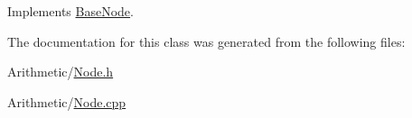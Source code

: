 Implements \hyperlink{class_base_node_aad2eb87014be9a786ec9a4c4ac405c45}{Base\-Node}.



The documentation for this class was generated from the following files\-:\begin{DoxyCompactItemize}
\item 
Arithmetic/\hyperlink{_node_8h}{Node.\-h}\item 
Arithmetic/\hyperlink{_node_8cpp}{Node.\-cpp}\end{DoxyCompactItemize}
